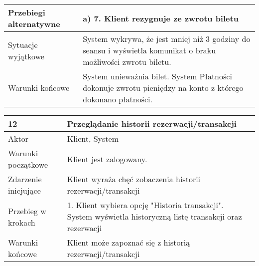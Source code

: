 \begin{tabularx}{\textwidth}{|l|X|}
Przebiegi alternatywne & a) 7. Klient rezygnuje ze zwrotu biletu                                                                                                                                                                                                                                                                                                                                                                                                          \\ \hline
Sytuacje wyjątkowe     & System wykrywa, że jest mniej niż 3 godziny do seansu i wyświetla komunikat o braku możliwości zwrotu biletu.                                                                                                                                                                                                                                                                                                                                    \\ \hline
Warunki końcowe        & System unieważnia bilet. \newpage System Płatności dokonuje zwrotu pieniędzy na konto z którego dokonano płatności.                                                                                                                                                                                                                                                                                         \\ \hline
\end{tabularx}
\par
\begin{tabularx}{\textwidth}{|l|X|}
\hline
12                    & Przeglądanie historii rezerwacji/transakcji                                                                                                   \\ \hline
Aktor                  & Klient, System                                                                                                                                \\ \hline
Warunki początkowe     & Klient jest zalogowany.                                                                                                                       \\ \hline
Zdarzenie inicjujące   & Klient wyraża chęć zobaczenia historii rezerwacji/transakcji                                                                                  \\ \hline
Przebieg w krokach     & 1. Klient wybiera opcję "Historia transakcji"\newline 2. System wyświetla historyczną listę transakcji oraz rezerwacji \\ \hline
Warunki końcowe        & Klient może zapoznać się z historią rezerwacji/transakcji                                                                                     \\ \hline
\end{tabularx}
\newpage

